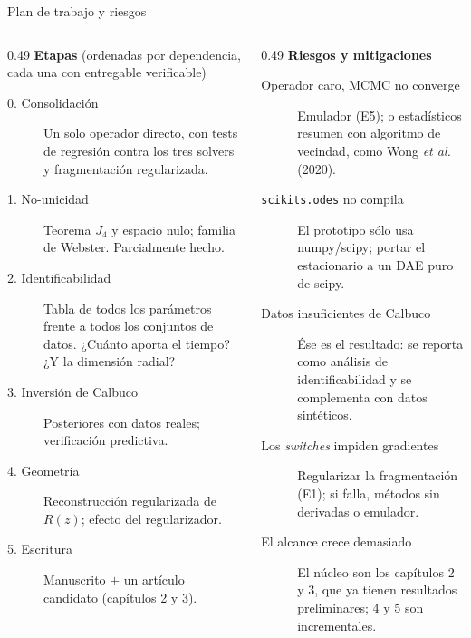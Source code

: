 \documentclass[aspectratio=169,10pt,t]{beamer}
\begin{document}
\begin{frame}{Plan de trabajo y riesgos}
\begin{columns}[T]
\begin{column}{0.49\textwidth}
\textbf{Etapas} \scriptsize(ordenadas por dependencia, cada una con
entregable verificable)
\smallskip
\scriptsize
\begin{description}
  \item[0. Consolidación] Un solo operador directo, con tests de regresión
    contra los tres solvers y fragmentación regularizada.
  \item[1. No-unicidad] Teorema $J_4$ y espacio nulo; familia de Webster.
    \alert{Parcialmente hecho.}
  \item[2. Identificabilidad] Tabla de todos los parámetros frente a todos los
    conjuntos de datos. ¿Cuánto aporta el tiempo? ¿Y la dimensión radial?
  \item[3. Inversión de Calbuco] Posteriores con datos reales; verificación
    predictiva.
  \item[4. Geometría] Reconstrucción regularizada de $R(z)$; efecto del
    regularizador.
  \item[5. Escritura] Manuscrito $+$ un artículo candidato (capítulos 2 y 3).
\end{description}
\end{column}
\begin{column}{0.49\textwidth}
\textbf{Riesgos y mitigaciones}
\smallskip
\scriptsize
\begin{description}
  \item[Operador caro, MCMC no converge] Emulador (E5); o estadísticos resumen
    con algoritmo de vecindad, como Wong \emph{et al.} (2020).
  \item[\texttt{scikits.odes} no compila] El prototipo sólo usa numpy/scipy;
    portar el estacionario a un DAE puro de scipy.
  \item[Datos insuficientes de Calbuco] Ése \alert{es} el resultado: se reporta
    como análisis de identificabilidad y se complementa con datos sintéticos.
  \item[Los \emph{switches} impiden gradientes] Regularizar la fragmentación
    (E1); si falla, métodos sin derivadas o emulador.
  \item[El alcance crece demasiado] El núcleo son los capítulos 2 y 3, que
    \alert{ya tienen resultados preliminares}; 4 y 5 son incrementales.
\end{description}
\end{column}
\end{columns}
\end{frame}
\end{document}
